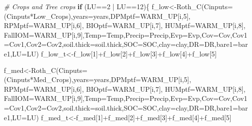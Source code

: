 \documentclass[
  10pt,
  b5paper,
]{book}
\newenvironment{Shaded}{\begin{snugshade}}{\end{snugshade}}
\newcommand{\AttributeTok}[1]{\textcolor[rgb]{0.77,0.63,0.00}{#1}}
\newcommand{\CommentTok}[1]{\textcolor[rgb]{0.56,0.35,0.01}{\textit{#1}}}
\newcommand{\ControlFlowTok}[1]{\textcolor[rgb]{0.13,0.29,0.53}{\textbf{#1}}}
\newcommand{\DecValTok}[1]{\textcolor[rgb]{0.00,0.00,0.81}{#1}}
\newcommand{\FunctionTok}[1]{\textcolor[rgb]{0.00,0.00,0.00}{#1}}
\newcommand{\NormalTok}[1]{#1}
\newcommand{\OtherTok}[1]{\textcolor[rgb]{0.56,0.35,0.01}{#1}}
\newcommand{\SpecialCharTok}[1]{\textcolor[rgb]{0.00,0.00,0.00}{#1}}
\begin{document}
\begin{Shaded}
\begin{Highlighting}[]
\CommentTok{\# Crops and Tree crops}
\ControlFlowTok{if}\NormalTok{ (LU}\SpecialCharTok{==}\DecValTok{2} \SpecialCharTok{|}\NormalTok{ LU}\SpecialCharTok{==}\DecValTok{12}\NormalTok{)\{}
\NormalTok{f\_low}\OtherTok{\textless{}{-}}\FunctionTok{Roth\_C}\NormalTok{(}\AttributeTok{Cinputs=}\NormalTok{(Cinputs}\SpecialCharTok{*}\NormalTok{Low\_Crops),}\AttributeTok{years=}\NormalTok{years,}\AttributeTok{DPMptf=}\NormalTok{WARM\_UP[i,}\DecValTok{5}\NormalTok{], }\AttributeTok{RPMptf=}\NormalTok{WARM\_UP[i,}\DecValTok{6}\NormalTok{], }\AttributeTok{BIOptf=}\NormalTok{WARM\_UP[i,}\DecValTok{7}\NormalTok{], }\AttributeTok{HUMptf=}\NormalTok{WARM\_UP[i,}\DecValTok{8}\NormalTok{], }\AttributeTok{FallIOM=}\NormalTok{WARM\_UP[i,}\DecValTok{9}\NormalTok{],}\AttributeTok{Temp=}\NormalTok{Temp,}\AttributeTok{Precip=}\NormalTok{Precip,}\AttributeTok{Evp=}\NormalTok{Evp,}\AttributeTok{Cov=}\NormalTok{Cov,}\AttributeTok{Cov1=}\NormalTok{Cov1,}\AttributeTok{Cov2=}\NormalTok{Cov2,}\AttributeTok{soil.thick=}\NormalTok{soil.thick,}\AttributeTok{SOC=}\NormalTok{SOC,}\AttributeTok{clay=}\NormalTok{clay,}\AttributeTok{DR=}\NormalTok{DR,}\AttributeTok{bare1=}\NormalTok{bare1,}\AttributeTok{LU=}\NormalTok{LU)}
\NormalTok{f\_low\_t}\OtherTok{\textless{}{-}}\NormalTok{f\_low[}\DecValTok{1}\NormalTok{]}\SpecialCharTok{+}\NormalTok{f\_low[}\DecValTok{2}\NormalTok{]}\SpecialCharTok{+}\NormalTok{f\_low[}\DecValTok{3}\NormalTok{]}\SpecialCharTok{+}\NormalTok{f\_low[}\DecValTok{4}\NormalTok{]}\SpecialCharTok{+}\NormalTok{f\_low[}\DecValTok{5}\NormalTok{]}

\NormalTok{f\_med}\OtherTok{\textless{}{-}}\FunctionTok{Roth\_C}\NormalTok{(}\AttributeTok{Cinputs=}\NormalTok{(Cinputs}\SpecialCharTok{*}\NormalTok{Med\_Crops),}\AttributeTok{years=}\NormalTok{years,}\AttributeTok{DPMptf=}\NormalTok{WARM\_UP[i,}\DecValTok{5}\NormalTok{], }\AttributeTok{RPMptf=}\NormalTok{WARM\_UP[i,}\DecValTok{6}\NormalTok{], }\AttributeTok{BIOptf=}\NormalTok{WARM\_UP[i,}\DecValTok{7}\NormalTok{], }\AttributeTok{HUMptf=}\NormalTok{WARM\_UP[i,}\DecValTok{8}\NormalTok{], }\AttributeTok{FallIOM=}\NormalTok{WARM\_UP[i,}\DecValTok{9}\NormalTok{],}\AttributeTok{Temp=}\NormalTok{Temp,}\AttributeTok{Precip=}\NormalTok{Precip,}\AttributeTok{Evp=}\NormalTok{Evp,}\AttributeTok{Cov=}\NormalTok{Cov,}\AttributeTok{Cov1=}\NormalTok{Cov1,}\AttributeTok{Cov2=}\NormalTok{Cov2,}\AttributeTok{soil.thick=}\NormalTok{soil.thick,}\AttributeTok{SOC=}\NormalTok{SOC,}\AttributeTok{clay=}\NormalTok{clay,}\AttributeTok{DR=}\NormalTok{DR,}\AttributeTok{bare1=}\NormalTok{bare1,}\AttributeTok{LU=}\NormalTok{LU)}
\NormalTok{f\_med\_t}\OtherTok{\textless{}{-}}\NormalTok{f\_med[}\DecValTok{1}\NormalTok{]}\SpecialCharTok{+}\NormalTok{f\_med[}\DecValTok{2}\NormalTok{]}\SpecialCharTok{+}\NormalTok{f\_med[}\DecValTok{3}\NormalTok{]}\SpecialCharTok{+}\NormalTok{f\_med[}\DecValTok{4}\NormalTok{]}\SpecialCharTok{+}\NormalTok{f\_med[}\DecValTok{5}\NormalTok{]}


\end{Highlighting}
\end{Shaded}
\end{document}
